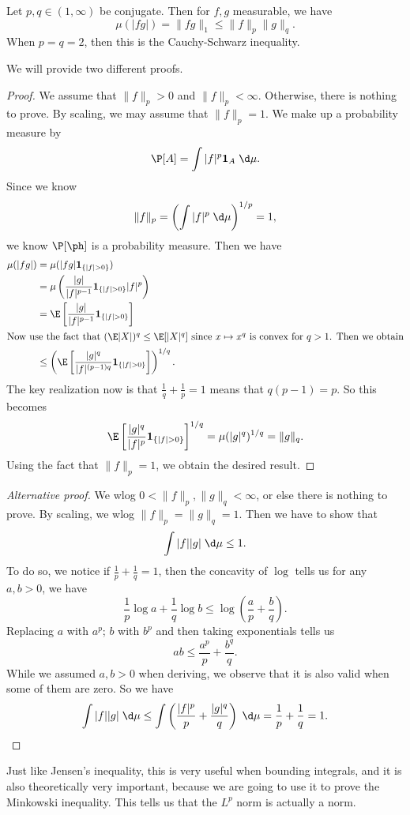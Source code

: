 \documentclass[a4paper]{article}
\begin{document}
\begin{prop}
  Let $p, q \in (1, \infty)$ be conjugate. Then for $f, g$ measurable, we have
  \[
    \mu(|fg|) = \|fg\|_1 \leq \|f\|_p \|g\|_q.
  \]
  When $p = q = 2$, then this is the Cauchy-Schwarz inequality.
\end{prop}

We will provide two different proofs.
\begin{proof}
  We assume that $\|f\|_p > 0$ and $\|f\|_p < \infty$. Otherwise, there is nothing to prove. By scaling, we may assume that $\|f\|_p = 1$. We make up a probability measure by
  \[
    \P[A] = \int |f|^p \mathbf{1}_A \;\d \mu.
  \]
  Since we know
  \[
    \|f\|_p = \left(\int |f|^p\;\d \mu\right)^{1/p} = 1,
  \]
  we know $\P[\ph]$ is a probability measure. Then we have
  \begin{align*}
    \mu(|fg|) &= \mu(|fg| \mathbf{1}_{\{|f| > 0\}})\\
    &= \mu\left(\frac{|g|}{|f|^{p - 1}} \mathbf{1}_{\{|f| > 0\}} |f|^p\right)\\
    &= \E\left[\frac{|g|}{|f|^{p - 1}}\mathbf{1}_{\{|f| > 0\}}\right]\\
    \intertext{Now use the fact that $(\E|X|)^q \leq \E[|X|^q]$ since $x \mapsto x^q$ is convex for $q > 1$. Then we obtain}
    &\leq \left(\E\left[\frac{|g|^q}{|f|^{(p - 1)q}}\mathbf{1}_{\{|f| > 0\}}\right]\right)^{1/q}.
  \end{align*}
  The key realization now is that $\frac{1}{q} + \frac{1}{p} = 1$ means that $q(p - 1) = p$. So this becomes
  \[
    \E\left[\frac{|g|^q}{|f|^p} \mathbf{1}_{\{|f| > 0\}}\right]^{1/q} = \mu(|g|^q)^{1/q} = \|g\|_q.
  \]
  Using the fact that $\|f\|_p = 1$, we obtain the desired result.
\end{proof}

\begin{proof}[Alternative proof]
  We wlog $0 < \|f\|_p, \|g\|_q < \infty$, or else there is nothing to prove. By scaling, we wlog $\|f\|_p = \|g\|_q = 1$. Then we have to show that
  \[
    \int |f||g| \;\d \mu \leq 1.
  \]
  To do so, we notice if $\frac{1}{p} + \frac{1}{q} = 1$, then the concavity of $\log$ tells us for any $a, b > 0$, we have
  \[
    \frac{1}{p} \log a + \frac{1}{q} \log b \leq \log \left(\frac{a}{p} + \frac{b}{q}\right).
  \]
  Replacing $a$ with $a^p$; $b$ with $b^p$ and then taking exponentials tells us
  \[
    a b \leq \frac{a^p}{p} + \frac{b^q}{q}.
  \]
  While we assumed $a, b > 0$ when deriving, we observe that it is also valid when some of them are zero. So we have
  \[
    \int |f||g| \;\d \mu \leq \int \left(\frac{|f|^p}{p} + \frac{|g|^q}{q}\right) \;\d \mu = \frac{1}{p} + \frac{1}{q} = 1.\qedhere
  \]
\end{proof}
Just like Jensen's inequality, this is very useful when bounding integrals, and it is also theoretically very important, because we are going to use it to prove the Minkowski inequality. This tells us that the $L^p$ norm is actually a norm.
\end{document}
